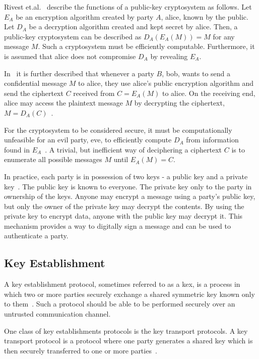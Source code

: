 Rivest et.al.~\cite{rsa1977} describe the functions of a public-key cryptosystem as follows. Let $E_A$ be an encryption algorithm created by party $A$, \gls{alice}, known by the public. Let $D_A$ be a decryption algorithm created and kept secret by \gls{alice}. Then, a public-key cryptosystem can be described as $D_A(E_A(M))=M$ for any message $M$. Such a cryptosystem must be efficiently computable. Furthermore, it is assumed that \gls{alice} does not compromise $D_A$ by revealing $E_A$.

In~\cite{rsa1977} it is further described that whenever a party $B$, \gls{bob}, wants to send a confidential message $M$ to \gls{alice}, they use \gls{alice}'s public encryption algorithm and send the ciphertext $C$ received from $C=E_A(M)$ to \gls{alice}. On the receiving end, \gls{alice} may access the plaintext message $M$ by decrypting the ciphertext, $M=D_A(C)$~\cite{rsa1977}.

For the cryptosystem to be considered secure, it must be computationally unfeasible for an evil party, \gls{eve}, to efficiently compute $D_A$ from information found in $E_A$~\cite{rsa1977}. A trivial, but inefficient way of deciphering a ciphertext $C$ is to enumerate all possible messages $M$ until $E_A(M)=C$.

In practice, each party is in possession of two keys - a public key and a private key~\cite{bernstein2017}. The public key is known to everyone. The private key only to the party in ownership of the keys. Anyone may encrypt a message using a party's public key, but only the owner of the private key may decrypt the contents. By using the private key to encrypt data, anyone with the public key may decrypt it. This mechanism provides a way to digitally sign a message and can be used to authenticate a party.

\subsection{Key Establishment}

A key establishment protocol, sometimes referred to as a \acrfull{kex}, is a process in which two or more parties securely exchange a shared symmetric key known only to them~\cite{boyd2020}. Such a protocol should be able to be performed securely over an untrusted communication channel.

One class of key establishments protocols is the key transport protocols. A key transport protocol is a protocol where one party generates a shared key which is then securely transferred to one or more parties~\cite{boyd2020}.


